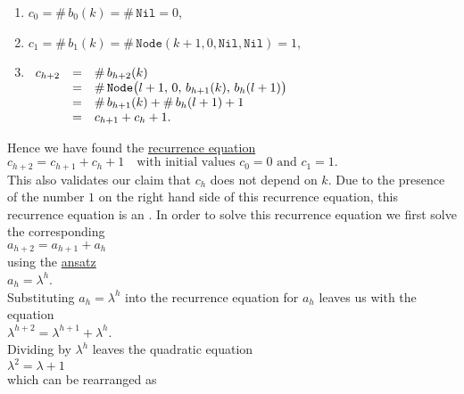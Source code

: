 \begin{enumerate}
\item $c_0 = \#\, b_0(k) = \#\, \texttt{Nil} = 0$,
\item $c_1 = \#\, b_1(k) = \#\, \texttt{Node}(k+1,0,\texttt{Nil}, \texttt{Nil}) = 1$, 
\item$\begin{array}[t]{lcl}
       c_{h+2} & = & \#\, b_{h+2}(k) \\
               & = & \#\,\texttt{Node}\bigl(l+1,\,0,\,b_{h+1}(k),\,b_h(l+1)\bigr) \\
               & = & \#\, b_{h+1}(k) + \#\, b_h(l+1) + 1 \\
               & = & c_{h+1} + c_h + 1.
       \end{array}$
\end{enumerate}
Hence we have found the \href{https://en.wikipedia.org/wiki/Recurrence_relation}{recurrence equation}
\\[0.2cm]
\hspace*{1.3cm}
$c_{h+2} = c_{h+1} + c_h + 1 \quad \mbox{with initial values $c_0 = 0$ and $c_1 = 1$}.$
\\[0.2cm]
This also validates our claim that $c_h$ does not depend on $k$.  Due to the presence of the number $1$ on the
right hand side of this recurrence equation, this recurrence equation is an 
.  In order to solve this recurrence
equation we first solve the corresponding  
\\[0.2cm]
\hspace*{1.3cm}
$a_{h+2} = a_{h+1} + a_h$
\\[0.2cm]
using the \href{https://en.wikipedia.org/wiki/Ansatz}{ansatz}
\\[0.2cm]
\hspace*{1.3cm}
$a_h = \lambda^h$.
\\[0.2cm]
Substituting $a_h = \lambda^h$ into the recurrence equation for $a_h$ leaves us with the equation
\\[0.2cm]
\hspace*{1.3cm}
$\lambda^{h+2} = \lambda^{h+1} + \lambda^{h}$.
\\[0.2cm]
Dividing by $\lambda^h$ leaves the quadratic equation
\\[0.2cm]
\hspace*{1.3cm}
$\lambda^2 = \lambda + 1$
\\[0.2cm]
which can be rearranged as
\\[0.2cm]
\hspace*{1.3cm}
